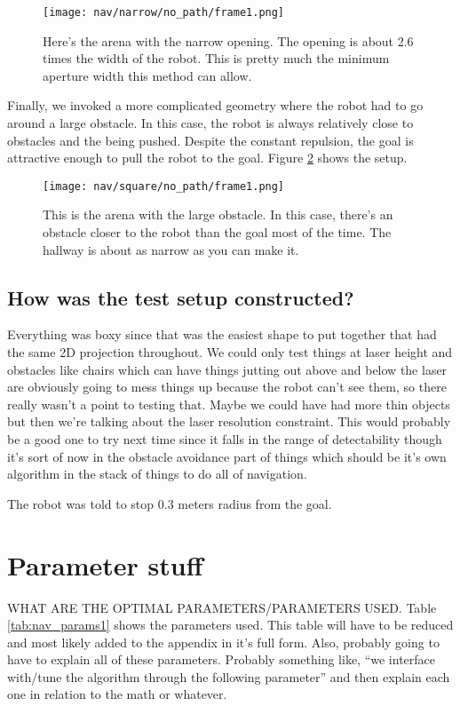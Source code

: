 \begin{figure}
  \texttt{[image: nav/narrow/no\_path/frame1.png]}
  \caption{Here's the arena with the narrow opening.
           The opening is about 2.6 times the width of the robot.
           This is pretty much the minimum aperture width this method can allow.}
  \label{fig:nav_narrow_setup1}
\end{figure}

Finally, we invoked a more complicated geometry where the robot had to go around
a large obstacle. In this case, the robot is always relatively close to obstacles and the
being pushed. Despite the constant repulsion, the goal is attractive enough to
pull the robot to the goal. Figure \ref{fig:nav_square_setup1} shows the setup.

\begin{figure}
  \texttt{[image: nav/square/no\_path/frame1.png]}
  \caption{This is the arena with the large obstacle.
           In this case, there's an obstacle closer to the robot than the goal most of the time.
           The hallway is about as narrow as you can make it.}
  \label{fig:nav_square_setup1}
\end{figure}

\subsection{How was the test setup constructed?}
Everything was boxy since that was the easiest shape to put together that had the
same 2D projection throughout. We could only test things at laser height and obstacles
like chairs which can have things jutting out above and below the laser are obviously going
to mess things up because the robot can't see them, so there really wasn't a point to testing
that.
Maybe we could have had more thin objects but then we're talking about the laser resolution
constraint. This would probably be a good one to try next time since it falls in the range of
detectability though it's sort of now in the obstacle avoidance part of things
which should be it's own algorithm in the stack of things to do all of navigation.

The robot was told to stop 0.3 meters radius from the goal.

\section{Parameter stuff}
WHAT ARE THE OPTIMAL PARAMETERS/PARAMETERS USED.
Table \ref{tab:nav_params1} shows the parameters used.
This table will have to be reduced and most likely added to the appendix in it's
full form. Also, probably going to have to explain all of these parameters.
Probably something like, ``we interface with/tune the algorithm through the following parameter''
and then explain each one in relation to the math or whatever.


